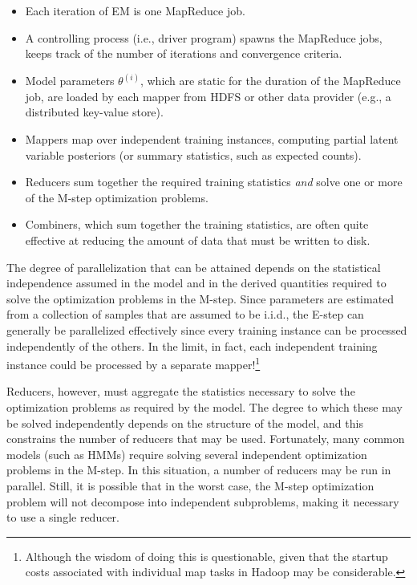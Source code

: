 \begin{itemize}

\item Each iteration of EM is one MapReduce job.

\item A controlling process (i.e., driver program) spawns the
  MapReduce jobs, keeps track of the number of iterations and
  convergence criteria.

\item Model parameters $\theta^{(i)}$, which are static for the
  duration of the MapReduce job, are loaded by each mapper from HDFS
  or other data provider (e.g., a distributed key-value store).

\item Mappers map over independent training instances, computing
  partial latent variable posteriors (or summary statistics, such as
  expected counts).

\item Reducers sum together the required training statistics
  \emph{and} solve one or more of the M-step optimization problems.

\item Combiners, which sum together the training statistics, are often
  quite effective at reducing the amount of data that must be written
  to disk.

\end{itemize}

\noindent The degree of parallelization that can be attained depends
on the statistical independence assumed in the model and in the
derived quantities required to solve the optimization problems in the
M-step.  Since parameters are estimated from a collection of samples
that are assumed to be i.i.d., the E-step can generally be
parallelized effectively since every training instance can be
processed independently of the others.  In the limit, in fact, each
independent training instance could be processed by a separate
mapper!\footnote{Although the wisdom of doing this is questionable,
  given that the startup costs associated with individual map tasks in
  Hadoop may be considerable.}

Reducers, however, must aggregate the statistics necessary to solve
the optimization problems as required by the model.  The degree to
which these may be solved independently depends on the structure of
the model, and this constrains the number of reducers that may be
used.  Fortunately, many common models (such as HMMs) require solving
several independent optimization problems in the M-step.  In this
situation, a number of reducers may be run in parallel.  Still, it is
possible that in the worst case, the M-step optimization problem will
not decompose into independent subproblems, making it necessary to use
a single reducer.

